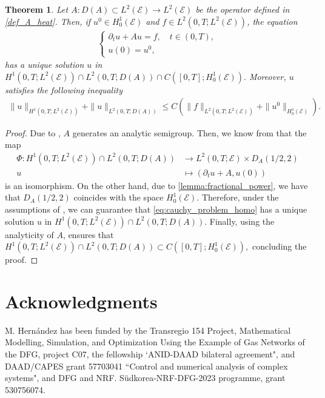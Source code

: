 \documentclass[10pt,a4paper]{amsart}
\def\to{\rightarrow}
\newtheorem{theorem}{Theorem}[section]
\begin{document}
\begin{theorem}\label{th:maximal_regularity}
Let $A:D(A)\subset L^2(\mathcal{E})\to L^2(\mathcal{E})$ be the operator defined in \eqref{def_A_heat}. Then, if $u^0\in H^1_0(\mathcal{E})$ and $f\in L^2(0,T;L^2(\mathcal{E}))$, the equation 
\begin{align}\label{eq:cauchy_problem_homo}
    \begin{cases}
        \partial_t u + Au = f, \quad t\in (0,T),\\
    u(0)=u^0,
    \end{cases}
\end{align}
has a unique solution $u$ in $ H^1(0,T;L^2(\mathcal{E}))\cap L^2(0,T;D(A))\cap C([0, T]; H_0^1(\mathcal{E})).$ Moreover, $u$ satisfies the following inequality
\begin{align*}
        \|u\|_{H^1(0, T; L^2(\mathcal{E}))} + \|u\|_{L^2(0, T; D(A))} \leq C \left( \|f\|_{L^2(0, T; L^2(\mathcal{E}))} + \|u^0\|_{H^1_0(\mathcal{E})} \right).
    \end{align*} 
\end{theorem}
\begin{proof}
    Due to , $A$ generates an analytic semigroup. Then, we know from \cite[Theorem 3.1]{Bensoussan} that the map 
    \begin{align*}
    \Phi:H^1(0,T;L^2(\mathcal{E}))\cap L^2(0,T;D(A))& \to  L^2(0,T;\mathcal{E})\times D_A(1/2,2)\\
    u&\mapsto (\partial_t u +A,u(0))
    \end{align*}
    is an isomorphism. On the other hand, due to \cref{lemma:fractional_power}, we have that $D_{A}(1/2,2)$ coincides with the space $H^1_{0}(\mathcal{E})$. Therefore, under the assumptions of , we can guarantee that  \eqref{eq:cauchy_problem_homo} has a unique solution $u$ in   $H^1(0,T;L^2(\mathcal{E}))\cap L^2(0,T;D(A))$. Finally, using the analyticity of $A$, \cite[Remark 4.2]{Bensoussan} ensures that $H^1(0,T;L^2(\mathcal{E}))\cap L^2(0,T;D(A))\subset C([0, T]; H_0^1(\mathcal{E})),$ concluding the proof.

\end{proof}




	\vspace{5mm}
	\section*{Acknowledgments}
M. Hern\'{a}ndez has been funded by the Transregio 154 Project, Mathematical Modelling, Simulation, and Optimization Using the Example of Gas Networks of the DFG, project C07, the fellowship `ANID-DAAD bilateral agreement", and DAAD/CAPES grant 57703041 ``Control and numerical analysis of complex systems", and  DFG and NRF. Südkorea-NRF-DFG-2023 programme, grant 530756074.
\end{document}
